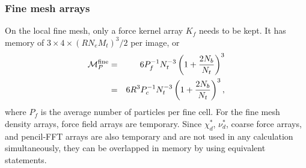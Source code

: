 \documentclass[10pt,twocolumn,preprint]{emulateapj}
\begin{document}
\subsubsection{Fine mesh arrays}
On the local fine mesh, only a force kernel array $K_f$ needs to be kept. It has memory of $3\times 4\times(RN_e M_t)^3/2$ per image, or
\begin{eqnarray}\label{eq.Mp_fine}
\nonumber	\mathcal{M}_P^{\rm fine}&=&6 P_f^{-1} N_t^{-3} \left ( 1+\frac{2N_b}{N_t} \right )^3 \\
					 &=& 6 R^3 P_c^{-1} N_t^{-3} \left ( 1+\frac{2N_b}{N_t} \right )^3,
\end{eqnarray}
where $P_f$ is the average number of particles per fine cell. For the fine mesh density arrays, force field arrays are temporary. Since $\chi_d^*$, $\nu_d^*$, coarse force arrays, and pencil-FFT arrays are also temporary and are not used in any calculation simultaneously, they can be overlapped in memory by using equivalent statements.
\end{document}
